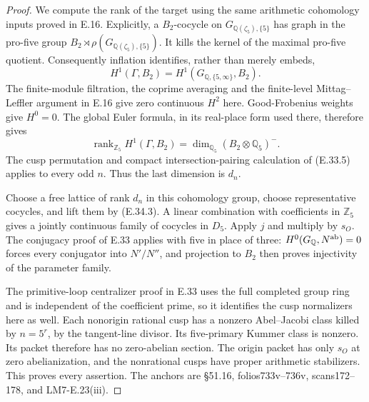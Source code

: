 \begin{proof}
We compute the rank of the target using
the same arithmetic cohomology inputs
proved in E.16. Explicitly, a $B_2$-cocycle
on $G_{\mathbb Q(\zeta_5),\{5\}}$ has
graph in the pro-five group
$B_2\rtimes\rho(G_{\mathbb Q(\zeta_5),\{5\}})$.
It kills the kernel of the maximal
pro-five quotient. Consequently inflation
identifies, rather than merely embeds,
\[
 H^1(\Gamma,B_2)
       =H^1(G_{\mathbb Q,\{5,\infty\}},B_2).
 \tag{E.34.6}
\]
The finite-module filtration, the
coprime averaging and the finite-level
Mittag--Leffler argument in E.16 give
zero continuous $H^2$ here. Good-Frobenius
weights give $H^0=0$. The global Euler
formula, in its real-place form used
there, therefore gives
\[
 \operatorname{rank}_{\mathbb Z_5}H^1(\Gamma,B_2)
       =\dim_{\mathbb Q_5}(B_2\otimes\mathbb Q_5)^-.
 \tag{E.34.7}
\]
The cusp permutation and compact
intersection-pairing calculation of
(E.33.5) applies to every odd $n$.
Thus the last dimension is $d_n$.

Choose a free lattice of rank $d_n$
in this cohomology group, choose
representative cocycles, and lift
them by (E.34.3). A linear combination
with coefficients in $\mathbb Z_5$
gives a jointly continuous family of
cocycles in $D_5$. Apply $j$ and
multiply by $s_O$. The conjugacy proof
of E.33 applies with five in place
of three: $H^0(G_{\mathbb Q},N^{\rm ab})=0$
forces every conjugator into $N'/N''$,
and projection to $B_2$ then proves
injectivity of the parameter family.

The primitive-loop centralizer proof
in E.33 uses the full completed
group ring and is independent of
the coefficient prime, so it
identifies the cusp normalizers
here as well. Each nonorigin
rational cusp has a nonzero
Abel--Jacobi class killed by
$n=5^r$, by the tangent-line
divisor. Its five-primary Kummer
class is nonzero. Its packet
therefore has no zero-abelian
section. The origin packet has
only $s_O$ at zero abelianization,
and the nonrational cusps have
proper arithmetic stabilizers.
This proves every assertion.
The anchors are \S51.16,
folios733v--736v, scans172--178,
and LM7-E.23(iii).
\end{proof}
